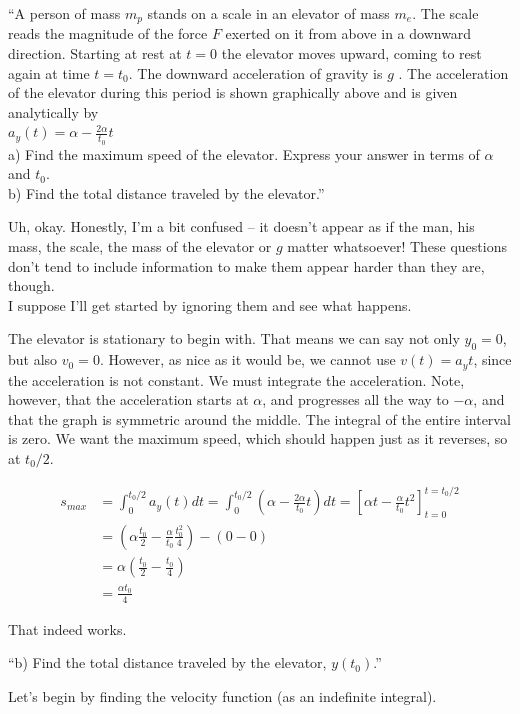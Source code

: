 \documentclass[8.01x]{subfiles}
\begin{document}
``A person of mass $m_p$ stands on a scale in an elevator of mass $m_e$. The scale reads the magnitude of the force $F$ exerted on it from above in a downward direction. Starting at rest at $t = 0$ the elevator moves upward, coming to rest again at time $t = t_0$. The downward acceleration of gravity is $g$ . The acceleration of the elevator during this period is shown graphically above and is given analytically by\\
$\displaystyle a_y(t) = \alpha - \frac{2\alpha}{t_0} t$\\
a) Find the maximum speed of the elevator. Express your answer in terms of $\alpha$ and $t_0$.\\
b) Find the total distance traveled by the elevator.''

Uh, okay. Honestly, I'm a bit confused -- it doesn't appear as if the man, his mass, the scale, the mass of the elevator or $g$ matter whatsoever! These questions don't tend to include information to make them appear harder than they are, though.\\
I suppose I'll get started by ignoring them and see what happens.

The elevator is stationary to begin with. That means we can say not only $y_0 = 0$, but also $v_0 = 0$. However, as nice as it would be, we cannot use $v(t) = a_y t$, since the acceleration is not constant. We must integrate the acceleration. Note, however, that the acceleration starts at $\alpha$, and progresses all the way to $-\alpha$, and that the graph is symmetric around the middle. The integral of the entire interval is zero. We want the maximum speed, which should happen just as it reverses, so at $t_0/2$.

\begin{align}
s_{max} &= \int_0^{t_0/2} a_y(t) dt = \int_0^{t_0/2} \left( \alpha - \frac{2\alpha}{t_0} t \right) dt = \left[\alpha t - \frac{\alpha}{t_0} t^2\right]_{t=0}^{t=t_0/2}\\
        &= \left(\alpha \frac{t_0}{2} - \frac{\alpha}{t_0} \frac{t_0^2}{4} \right) - (0 - 0)\\
        &= \alpha \left(\frac{t_0}{2} - \frac{t_0}{4} \right)\\
        &= \frac{\alpha t_0}{4}
\end{align}

That indeed works.

``b) Find the total distance traveled by the elevator, $y(t_0)$.''

Let's begin by finding the velocity function (as an indefinite integral).
\end{document}

